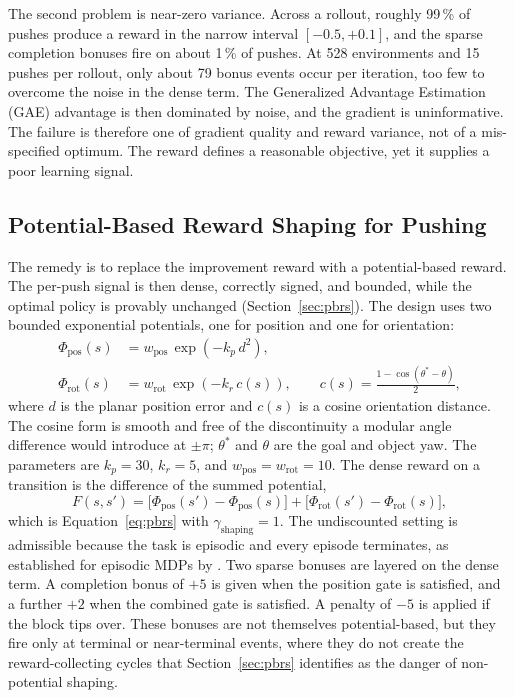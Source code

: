 The second problem is near-zero variance. Across a rollout, roughly 99\,\% of
pushes produce a reward in the narrow interval $[-0.5, +0.1]$, and the sparse
completion bonuses fire on about 1\,\% of pushes. At 528 environments and 15
pushes per rollout, only about 79 bonus events occur per iteration, too few to
overcome the noise in the dense term. The Generalized Advantage Estimation (GAE)
advantage is then dominated by noise, and the gradient is uninformative. The
failure is therefore one of gradient quality and reward variance, not of a
mis-specified optimum. The reward defines a reasonable objective, yet it supplies
a poor learning signal.

\subsection{Potential-Based Reward Shaping for Pushing}
\label{sec:pbrs_design}

The remedy is to replace the improvement reward with a potential-based reward.
The per-push signal is then dense, correctly signed, and bounded, while the
optimal policy is provably unchanged (Section~\ref{sec:pbrs}). The design uses two
bounded exponential potentials, one for position and one for orientation:
\begin{align}
    \Phi_{\text{pos}}(s) &= w_{\text{pos}}\, \exp\!\left(-k_p\, d^2\right), \label{eq:phi_pos}\\
    \Phi_{\text{rot}}(s) &= w_{\text{rot}}\, \exp\!\left(-k_r\, c(s)\right),
    \qquad c(s) = \frac{1 - \cos(\theta^{*} - \theta)}{2}, \label{eq:phi_rot}
\end{align}
where $d$ is the planar position error and $c(s)$ is a cosine orientation
distance. The cosine form is smooth and free of the discontinuity a modular angle
difference would introduce at $\pm\pi$; $\theta^{*}$ and $\theta$ are the goal and
object yaw. The parameters are $k_p = 30$, $k_r = 5$, and $w_{\text{pos}} =
w_{\text{rot}} = 10$. The dense reward on a transition is the difference of the
summed potential,
\begin{equation}
    F(s, s') = \big[\Phi_{\text{pos}}(s') - \Phi_{\text{pos}}(s)\big]
             + \big[\Phi_{\text{rot}}(s') - \Phi_{\text{rot}}(s)\big],
    \label{eq:pbrs_dense}
\end{equation}
which is Equation~\ref{eq:pbrs} with $\gamma_{\text{shaping}} = 1$. The
undiscounted setting is admissible because the task is episodic and every episode
terminates, as established for episodic MDPs by \cite{Grzes2017RewardShaping}. Two
sparse bonuses are layered on the dense term. A completion bonus of $+5$ is given
when the position gate is satisfied, and a further $+2$ when the combined gate is
satisfied. A penalty of $-5$ is applied if the block tips over. These bonuses are
not themselves potential-based, but they fire only at terminal or near-terminal
events, where they do not create the reward-collecting cycles that
Section~\ref{sec:pbrs} identifies as the danger of non-potential shaping.

